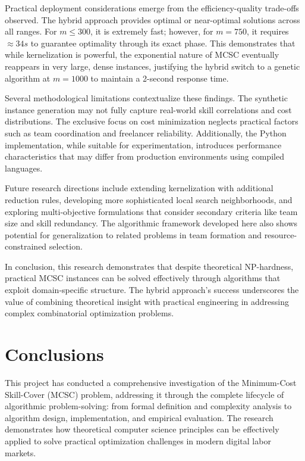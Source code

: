 \documentclass[12pt,a4paper]{article}
\begin{document}
Practical deployment considerations emerge from the efficiency-quality trade-offs observed. The hybrid approach provides optimal or near-optimal solutions across all ranges. For $m \le 300$, it is extremely fast; however, for $m=750$, it requires $\approx 34s$ to guarantee optimality through its exact phase. This demonstrates that while kernelization is powerful, the exponential nature of MCSC eventually reappears in very large, dense instances, justifying the hybrid switch to a genetic algorithm at $m=1000$ to maintain a 2-second response time.

Several methodological limitations contextualize these findings. The synthetic instance generation may not fully capture real-world skill correlations and cost distributions. The exclusive focus on cost minimization neglects practical factors such as team coordination and freelancer reliability. Additionally, the Python implementation, while suitable for experimentation, introduces performance characteristics that may differ from production environments using compiled languages.

Future research directions include extending kernelization with additional reduction rules, developing more sophisticated local search neighborhoods, and exploring multi-objective formulations that consider secondary criteria like team size and skill redundancy. The algorithmic framework developed here also shows potential for generalization to related problems in team formation and resource-constrained selection.

In conclusion, this research demonstrates that despite theoretical NP-hardness, practical MCSC instances can be solved effectively through algorithms that exploit domain-specific structure. The hybrid approach's success underscores the value of combining theoretical insight with practical engineering in addressing complex combinatorial optimization problems.
	
\section{Conclusions}
\label{sec:conclusions}

This project has conducted a comprehensive investigation of the Minimum-Cost Skill-Cover (MCSC) problem, addressing it through the complete lifecycle of algorithmic problem-solving: from formal definition and complexity analysis to algorithm design, implementation, and empirical evaluation. The research demonstrates how theoretical computer science principles can be effectively applied to solve practical optimization challenges in modern digital labor markets.
\end{document}
